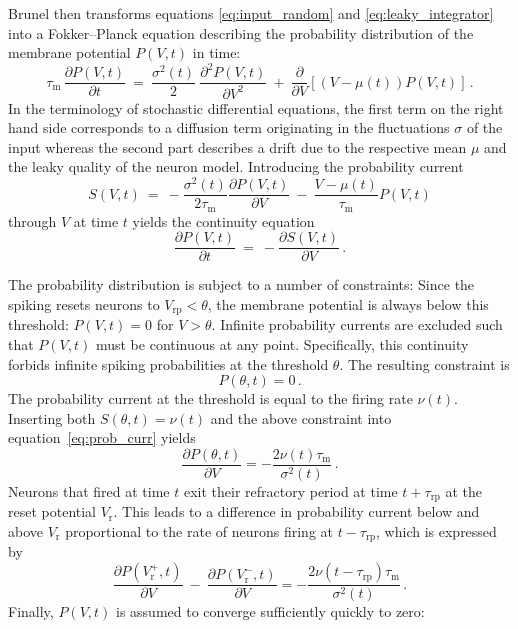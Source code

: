 Brunel then transforms equations \eqref{eq:input_random} and \eqref{eq:leaky_integrator}
into a Fokker--Planck equation describing the probability distribution of the membrane 
potential $P(V, t)$ in time: 
\begin{equation}
    \tau_\text{m} \, \frac{\partial P(V, t)}{\partial t} 
       \: = \: \frac{\sigma^2(t)}{2}  \: \frac{\partial^2 P(V, t)}{\partial V^2} 
         \: + \: \frac{\partial }{\partial V}  [(V- \mu(t)) P(V, t)] \, .
    \label{eq:fokker_planck}
\end{equation}
In the terminology of stochastic differential equations, the first term on the 
right hand side corresponds to a diffusion term originating in the fluctuations $\sigma$ 
of the input whereas the second part describes a drift due to the respective mean $\mu$ 
and the leaky quality of the neuron model. Introducing the probability current 
\begin{equation}
    S(V, t) 
    \: = \: - \frac{\sigma^2(t)}{2 \tau_\text{m}} \frac{\partial P(V, t)}{\partial V}  
        \: - \: \frac{V - \mu(t)}{\tau_\text{m}} P(V, t)
    \label{eq:prob_curr}
\end{equation}
through $V$ at time $t$ yields the continuity equation 
\begin{equation}
    \frac{\partial P(V, t)}{\partial t} \:=\: - \frac{\partial S(V, t)}{\partial V} \,.
    \label{eq:continuity}
\end{equation}

The probability distribution is subject to a number of 
constraints: Since the spiking resets neurons to $V_\text{rp} < \theta$, 
the membrane potential is always below this threshold:
$P(V, t) = 0$ for $V > \theta$. Infinite probability currents are excluded 
such that $P(V, t)$ must be continuous at any point. Specifically, 
this continuity forbids infinite spiking probabilities at the threshold $\theta$. 
The resulting constraint is 
\begin{equation}
    P(\theta, t) = 0 \,.
    \label{eq:continuity} 
\end{equation}
The probability current at the threshold is equal to the firing rate
$\nu(t)$. Inserting both $S(\theta, t) = \nu(t)$ and the above constraint into 
equation~\eqref{eq:prob_curr} yields
\begin{equation}
    \frac{\partial P(\theta, t)}{\partial V}    
        = - \frac{2 \nu(t) \tau_\text{m}}{\sigma^2(t)}  \,.
\end{equation}
Neurons that fired at time $t$ exit their refractory period at 
time $t + \tau_\text{rp}$ at the reset potential $V_\text{r}$. This leads to
a difference in probability current below and above $V_\text{r}$ proportional to 
the rate of neurons firing at $t - \tau_\text{rp}$, which is expressed by
\begin{equation}
    \frac{\partial P(V_\text{r}^+, t)}{\partial V} \: -  \: \frac{\partial P(V_\text{r}^-, t)}{\partial V} 
        = - \frac{2 \nu(t - \tau_\text{rp}) \tau_\text{m}}{\sigma^2(t)} \,.
\end{equation}
Finally, $P(V, t)$ is assumed to converge sufficiently quickly to zero:


